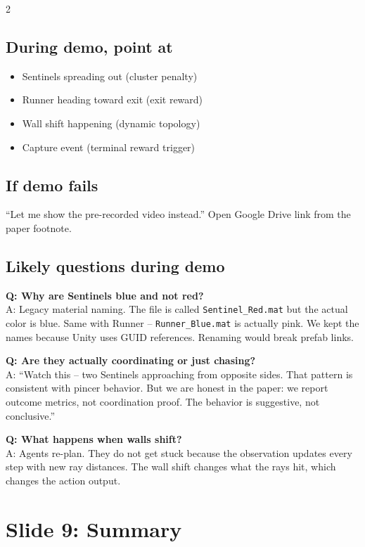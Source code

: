 \documentclass[9pt,a4paper]{article}
\begin{document}
\begin{multicols}{2}
\subsection{During demo, point at}
\begin{itemize}
\item Sentinels spreading out (cluster penalty)
\item Runner heading toward exit (exit reward)
\item Wall shift happening (dynamic topology)
\item Capture event (terminal reward trigger)
\end{itemize}

\subsection{If demo fails}
``Let me show the pre-recorded video instead.'' Open Google Drive link from the paper footnote.

\subsection{Likely questions during demo}
\textbf{Q: Why are Sentinels blue and not red?} \\
A: Legacy material naming. The file is called \texttt{Sentinel\_Red.mat} but the actual color is blue. Same with Runner -- \texttt{Runner\_Blue.mat} is actually pink. We kept the names because Unity uses GUID references. Renaming would break prefab links.

\textbf{Q: Are they actually coordinating or just chasing?} \\
A: ``Watch this -- two Sentinels approaching from opposite sides. That pattern is consistent with pincer behavior. But we are honest in the paper: we report outcome metrics, not coordination proof. The behavior is suggestive, not conclusive.''

\textbf{Q: What happens when walls shift?} \\
A: Agents re-plan. They do not get stuck because the observation updates every step with new ray distances. The wall shift changes what the rays hit, which changes the action output.

\section{Slide 9: Summary}


\end{multicols}
\end{document}
